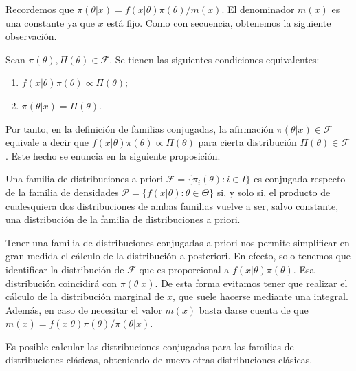 \documentclass{article}
\begin{document}
Recordemos que $\pi(\theta|x) = f(x|\theta)\pi(\theta) / m(x)$. El denominador $m(x)$ es una constante ya que $x$ está fijo. Como con secuencia, obtenemos la siguiente observación.

\begin{remark}
	Sean $\pi(\theta), \Pi(\theta) \in \mathcal{F}$. Se tienen las siguientes condiciones equivalentes:
	\begin{enumerate}%
		\item $f(x|\theta)\pi(\theta) \propto \Pi(\theta)$;
		\item $\pi(\theta|x)=\Pi(\theta)$.
	\end{enumerate}
\end{remark}

 Por tanto, en la definición de familias conjugadas, la afirmación $\pi(\theta|x) \in \mathcal{F}$ equivale a decir que $f(x|\theta)\pi(\theta) \propto \Pi(\theta)$ para cierta distribución $\Pi(\theta) \in \mathcal{F}$. Este hecho se enuncia en la siguiente proposición.

\begin{prop}
    Una familia de distribuciones a priori $\mathcal{F} = \{\pi_i(\theta): i\in I\}$ es conjugada respecto de la familia de densidades $\mathcal{P} = \{f(x|\theta): \theta\in\Theta\}$ si, y solo si, el producto de cualesquiera dos distribuciones de ambas familias vuelve a ser, salvo constante, una distribución de la familia de distribuciones a priori.
\end{prop}

Tener una familia de distribuciones conjugadas a priori nos permite simplificar en gran medida el cálculo de la distribución a posteriori. En efecto, solo tenemos que identificar la distribución de $\mathcal{F}$ que es proporcional a $f(x|\theta)\pi(\theta)$. Esa distribución coincidirá con $\pi(\theta | x)$. De esta forma evitamos tener que realizar el cálculo de la distribución marginal de $x$, que suele hacerse mediante una integral. Además, en caso de necesitar el valor $m(x)$ basta darse cuenta de que $m(x) = f(x|\theta)\pi(\theta) / \pi(\theta|x)$.


Es posible calcular las distribuciones conjugadas para las familias de distribuciones clásicas, obteniendo de nuevo otras distribuciones clásicas.
\end{document}
